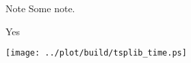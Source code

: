 \documentclass[
  size=10pt,
  style=klope,
  paper=screen,
  pauseslide,
  nopagebreaks,
  fleqn
]{powerdot}
\begin{document}
\begin{note}{Note}
  Some note.
\end{note}

\begin{wideslide}{Yes}
  \begin{center}
    \texttt{[image: ../plot/build/tsplib\_time.ps]}
  \end{center}
\end{wideslide}
\end{document}
